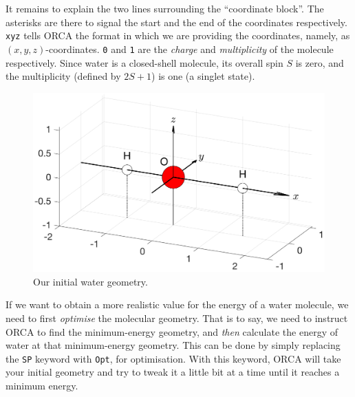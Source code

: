\documentclass[10pt]{article}
\begin{document}
It remains to explain the two lines surrounding the ``coordinate block''. The asterisks are there to signal the start and the end of the coordinates respectively. \texttt{xyz} tells ORCA the format in which we are providing the coordinates, namely, as \((x, y, z)\)-coordinates. \texttt{0} and \texttt{1} are the \textit{charge} and \textit{multiplicity} of the molecule respectively. Since water is a closed-shell molecule, its overall spin $S$ is zero, and the multiplicity (defined by $2S + 1$) is one (a singlet state).

\begin{figure}[H]
    \centering
    \includegraphics[scale=0.4]{./img/h2obadgeom}
    \caption{Our initial water geometry.}
    \label{fig:h2obadgeom}
\end{figure}

If we want to obtain a more realistic value for the energy of a water molecule, we need to first \textit{optimise} the molecular geometry. That is to say, we need to instruct ORCA to find the minimum-energy geometry, and \textit{then} calculate the energy of water at that minimum-energy geometry. This can be done by simply replacing the \texttt{SP} keyword with \texttt{Opt}, for optimisation. With this keyword, ORCA will take your initial geometry and try to tweak it a little bit at a time until it reaches a minimum energy.
\end{document}
